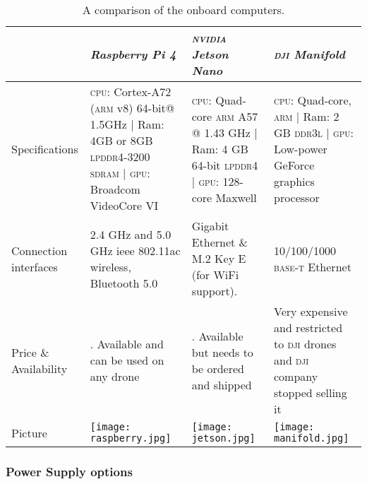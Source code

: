 \documentclass[../main.tex]{subfiles}
\begin{document}
\begin{table}[H]
	\centering
	\caption{A comparison of the onboard computers.}
	\label{tab:onboard-computers}  
	\begin{tabular}{ p{3cm} p{4cm} p{4cm} p{4cm} }
		\toprule
		\textit{} & \textit{Raspberry Pi 4} & \textit{\textsc{nvidia} Jetson Nano} & \textit{\textsc{dji} Manifold}\\ \midrule
		Specifications  & \textsc{cpu}: Cortex-A72 (\textsc{arm} v8) 64-bit@ 1.5GHz | Ram: 4GB or 8GB \textsc{lpddr4}-3200 \textsc{sdram} | \textsc{gpu}: Broadcom VideoCore VI & \textsc{cpu}: Quad-core \textsc{arm} A57 @ 1.43 GHz | Ram: 4 GB 64-bit \textsc{lpddr4}   | \textsc{gpu}: 128-core Maxwell & \textsc{cpu}: Quad-core, \textsc{arm} | Ram: 2 GB \textsc{ddr3l} | \textsc{gpu}: Low-power GeForce graphics processor \\ \addlinespace
		Connection interfaces & 2.4 GHz and 5.0 GHz \gls{ieee} 802.11ac wireless, Bluetooth 5.0 & Gigabit Ethernet \& M.2 Key E (for WiFi support). &10/100/1000 \textsc{base-t} Ethernet \\ \addlinespace
		
		Price \& Availability & \qar{300}. Available and can be used on any drone & \qar{400}. Available but needs to be ordered and shipped & Very expensive and restricted to \textsc{dji} drones and \textsc{dji} company stopped selling it \\ \addlinespace
		Picture & \begin{minipage}{.2\textwidth}
			\texttt{[image: raspberry.jpg]}
		\end{minipage}  & \begin{minipage}{.2\textwidth}
			\texttt{[image: jetson.jpg]}
		\end{minipage} & \begin{minipage}{.2\textwidth}
			\texttt{[image: manifold.jpg]}
		\end{minipage} \\
		\bottomrule
	\end{tabular}
\end{table}

\subsubsection{Power Supply options}
\end{document}
